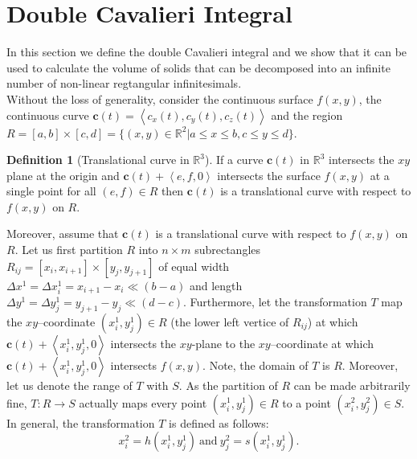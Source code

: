 \documentclass{article}
\theoremstyle{theorem}
\theoremstyle{definition}
\newtheorem*{definition}{Definition}
\begin{document}
\section{Double Cavalieri Integral}
In this section we define the double Cavalieri integral and we show that it can be used to calculate the volume of solids that can be decomposed into an infinite 
number of non-linear regtangular infinitesimals.\\

\noindent
Without the loss of generality, consider the continuous surface $f(x,y)$, the continuous curve $\mathbf{c}(t)=\left <c_x(t),c_y(t), c_z(t) \right >$ and the region $R = [a,b]\times [c,d] = \{(x,y)\in \mathbb{R}^2|a \leq x \leq b, c \leq y \leq d\}$.

\begin{definition}[Translational curve in $\mathbb{R}^3$]
If a curve $\mathbf{c}(t)$ in $\mathbb{R}^3$ intersects the $xy$ plane at the origin and $\mathbf{c}(t) + \left < e,f,0 \right >$ intersects 
the surface $f(x,y)$ at a single point for all $(e,f)\in R$ then $\mathbf{c}(t)$ is a translational curve 
with respect to $f(x,y)$ on $R$. 
\end{definition}

\noindent
Moreover, assume that $\mathbf{c}(t)$ is a translational curve with respect to $f(x,y)$ on $R$. Let us first partition $R$ into $n\times m$ subrectangles $R_{ij} = [x_{i},x_{i+1}] \times [y_{j},y_{j+1}]$ of equal width $\Delta x^1 = \Delta x_i^1 = x_{i+1}-x_i\ll (b-a)$ and length $\Delta y^1= \Delta y_j^1 = y_{j+1}-y_j\ll(d-c)$.
Furthermore, let the transformation $T$ map the $xy$--coordinate $(x_i^1,y_j^1)\in R$ (the lower left vertice of $R_{ij}$) at which $\mathbf{c}(t) + \left <x_i^1,y_j^1,0 \right >$ intersects the 
$xy$-plane to the $xy$--coordinate at which $\mathbf{c}(t) + \left <x_i^1,y_j^1,0 \right >$ intersects $f(x,y)$. Note, the domain of $T$ is $R$. Moreover, let us denote the range 
of $T$ with $S$. As the partition of $R$ can be made arbitrarily fine, $T:R\rightarrow S$ actually maps every point $(x_i^1,y_j^1)\in R$ to a point $(x_i^2,y_j^2)\in S$. In general, the transformation $T$ is defined as follows:
\begin{equation}
x_i^2 = h(x_i^1,y_j^1)~\textrm{and}~y_j^2 = s(x_i^1,y_j^1).
\end{equation}



\end{document}
